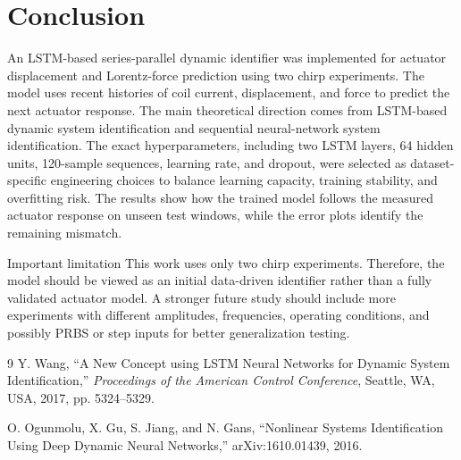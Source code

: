 \documentclass[11pt]{article}
\begin{document}
\section{Conclusion}
An LSTM-based series-parallel dynamic identifier was implemented for actuator displacement and Lorentz-force prediction using two chirp experiments. The model uses recent histories of coil current, displacement, and force to predict the next actuator response. The main theoretical direction comes from LSTM-based dynamic system identification and sequential neural-network system identification. The exact hyperparameters, including two LSTM layers, 64 hidden units, 120-sample sequences, learning rate, and dropout, were selected as dataset-specific engineering choices to balance learning capacity, training stability, and overfitting risk. The results show how the trained model follows the measured actuator response on unseen test windows, while the error plots identify the remaining mismatch.

\begin{cautionbox}{Important limitation}
This work uses only two chirp experiments. Therefore, the model should be viewed as an initial data-driven identifier rather than a fully validated actuator model. A stronger future study should include more experiments with different amplitudes, frequencies, operating conditions, and possibly PRBS or step inputs for better generalization testing.
\end{cautionbox}

\begin{thebibliography}{9}
Y. Wang, ``A New Concept using LSTM Neural Networks for Dynamic System Identification,'' \textit{Proceedings of the American Control Conference}, Seattle, WA, USA, 2017, pp. 5324--5329.

O. Ogunmolu, X. Gu, S. Jiang, and N. Gans, ``Nonlinear Systems Identification Using Deep Dynamic Neural Networks,'' arXiv:1610.01439, 2016.
\end{thebibliography}
\end{document}
